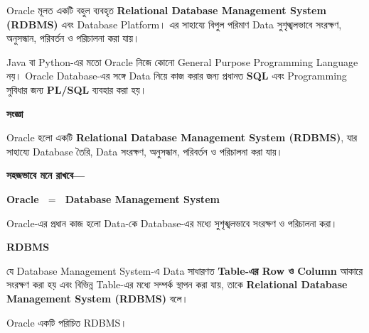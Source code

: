 
Oracle মূলত একটি বহুল ব্যবহৃত
\textbf{Relational Database Management System (RDBMS)}
এবং Database Platform। এর সাহায্যে বিপুল পরিমাণ Data
সুশৃঙ্খলভাবে সংরক্ষণ, অনুসন্ধান, পরিবর্তন ও পরিচালনা করা যায়।

Java বা Python-এর মতো Oracle নিজে কোনো General Purpose
Programming Language নয়। Oracle Database-এর সঙ্গে Data নিয়ে
কাজ করার জন্য প্রধানত \textbf{SQL} এবং Programming সুবিধার জন্য
\textbf{PL/SQL} ব্যবহার করা হয়।


\begin{definitionbox}

\textbf{\color{darkTeal}সংজ্ঞা}

Oracle হলো একটি
\textbf{Relational Database Management System (RDBMS)},
যার সাহায্যে Database তৈরি, Data সংরক্ষণ, অনুসন্ধান, পরিবর্তন
ও পরিচালনা করা যায়।

\end{definitionbox}

\textbf{সহজভাবে মনে রাখবে—}

\begin{center}

\textbf{
Oracle
\(\;=\;\)
Database Management System
}

\end{center}

Oracle-এর প্রধান কাজ হলো Data-কে Database-এর মধ্যে
সুশৃঙ্খলভাবে সংরক্ষণ ও পরিচালনা করা।


\begin{definitionbox}

\textbf{\color{darkTeal}RDBMS}

যে Database Management System-এ Data সাধারণত
\textbf{Table-এর Row ও Column} আকারে সংরক্ষণ করা হয় এবং
বিভিন্ন Table-এর মধ্যে সম্পর্ক স্থাপন করা যায়, তাকে
\textbf{Relational Database Management System (RDBMS)} বলে।

\end{definitionbox}

Oracle একটি পরিচিত RDBMS।

